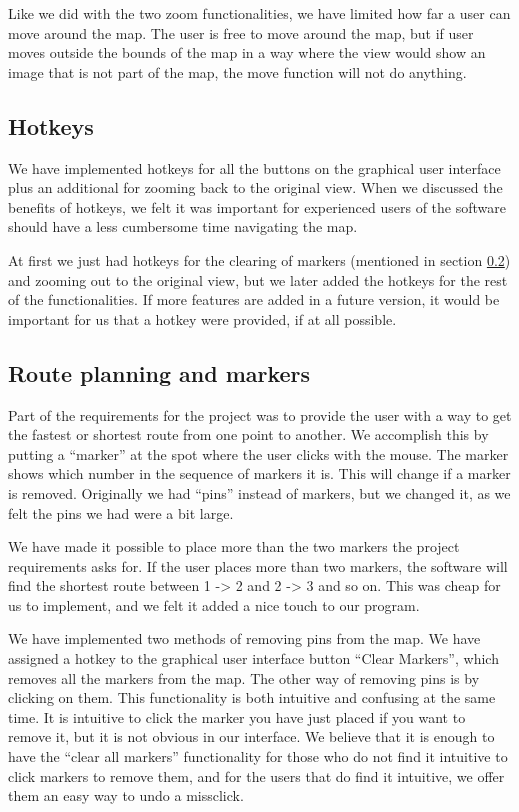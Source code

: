 Like we did with the two zoom functionalities, we have limited how far a user
can move around the map. The user is free to move around the map, but if user
moves outside the bounds of the map in a way where the view would show an image
that is not part of the map, the move function will not do anything.

\subsection{Hotkeys}
\label{UIA-IF-H}
We have implemented hotkeys for all the buttons on the graphical user interface
plus an additional for zooming back to the original view. When we discussed the
benefits of hotkeys, we felt it was important for experienced users of the
software should have a less cumbersome time navigating the map. 

At first we just had hotkeys for the clearing of markers (mentioned in section
\ref{UIA-IF-M}) and zooming out to the original view, but we later added the
hotkeys for the rest of the functionalities. If more features are added in a
future version, it would be important for us that a hotkey were provided, if at
all possible.

\subsection{Route planning and markers}
\label{UIA-IF-M}
Part of the requirements for the project was to provide the user with a way to
get the fastest or shortest route from one point to another. We accomplish this
by putting a ``marker'' at the spot where the user clicks with the mouse. The
marker shows which number in the sequence of markers it is. This will change 
if a marker is removed. Originally we had ``pins'' instead of markers, but we 
changed it, as we felt the pins we had were a bit large.

We have made it possible to place more than the two markers the project
requirements asks for. If the user places more than two markers, the software
will find the shortest route between 1 -> 2 and 2 -> 3 and so on. This was cheap for
us to implement, and we felt it added a nice touch to our program. 

We have implemented two methods of removing pins from the map. We have assigned
a hotkey to the graphical user interface button ``Clear Markers'', which removes 
all the markers from the map. The other way of removing pins is by clicking on
them. This functionality is both intuitive and confusing at the same time. It is
intuitive to click the marker you have just placed if you want to remove it, but
it is not obvious in our interface. We believe that it is enough to have the
``clear all markers'' functionality for those who do not find it intuitive to
click markers to remove them, and for the users that do find it intuitive, we
offer them an easy way to undo a missclick.

